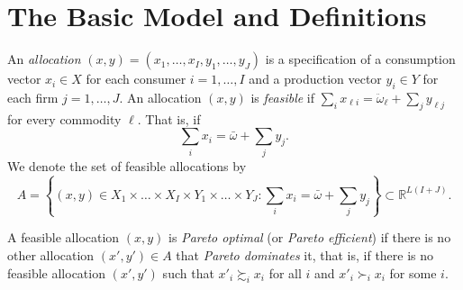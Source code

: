 \addtocounter{section}{1}

\section{The Basic Model and Definitions}

\begin{defn}
    An \emph{allocation} $(x, y) = (x_1, \dots, x_I, y_1, \dots, y_J)$ is a specification of a consumption vector $x_i \in X$ for each consumer $i = 1, \dots, I$ and a production vector $y_i \in Y$ for each firm $j = 1, \dots, J$. An allocation $(x, y)$ is \emph{feasible} if $\sum_i x_{\ell i} = \ddot{\omega}_\ell + \sum_j y_{\ell j}$ for every commodity $\ell$. That is, if
    \begin{equation}
        \sum_i x_i = \bar{\omega} + \sum_j y_j.
    \end{equation}
    We denote the set of feasible allocations by
    \begin{equation*}
        A = \left\{ (x, y) \in X_1 \times \dots \times X_I \times Y_1 \times \dots \times Y_J : \sum_i x_i = \bar{\omega} + \sum_j y_j\right\} \subset \mathbb{R}^{L(I + J)}.
    \end{equation*}
\end{defn}

\begin{defn}
    A feasible allocation $(x, y)$ is \emph{Pareto optimal} (or \emph{Pareto efficient}) if there is no other allocation $(x', y') \in A$ that \emph{Pareto dominates} it, that is, if there is no feasible allocation $(x', y')$ such that $x'_i \succsim_i x_i$ for all $i$ and $x'_i \succ_i x_i$ for some $i$.
\end{defn}


